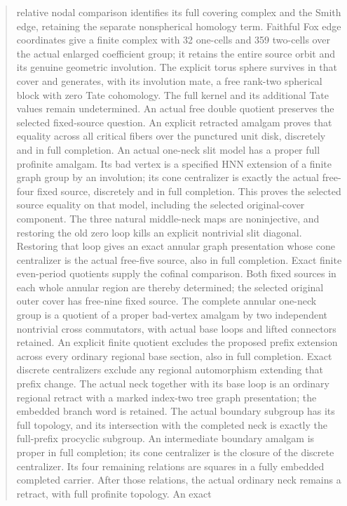 \documentclass[11pt,a4paper]{article}
\begin{document}
\begin{abstract}
relative nodal comparison identifies its full covering complex and the
Smith edge, retaining the separate nonspherical homology term. Faithful
Fox edge coordinates give a finite complex with 32 one-cells and 359
two-cells over the actual enlarged coefficient group; it retains the
entire source orbit and its genuine geometric involution. The explicit
torus sphere survives in that cover and generates, with its involution
mate, a free rank-two spherical block with zero Tate cohomology. The
full kernel and its additional Tate values remain undetermined. An actual
free double quotient preserves the selected fixed-source question.
An explicit retracted amalgam proves that equality across all critical
fibers over the punctured unit disk, discretely and in full completion.
An actual one-neck slit model has a proper full profinite amalgam.
Its bad vertex is a specified HNN extension of a finite graph group by
an involution; its cone centralizer is exactly the actual free-four
fixed source, discretely and in full completion. This proves the selected
source equality on that model, including the selected original-cover
component. The three natural middle-neck maps are noninjective, and
restoring the old zero loop kills an explicit nontrivial slit diagonal.
Restoring that loop gives an exact annular graph presentation whose
cone centralizer is the actual free-five source, also in full completion.
Exact finite even-period quotients supply the cofinal comparison. Both
fixed sources in each whole annular region are thereby determined; the
selected original outer cover has free-nine fixed source. The complete
annular one-neck group is a quotient of a proper bad-vertex amalgam by
two independent nontrivial cross commutators, with actual base loops
and lifted connectors retained. An explicit finite quotient excludes the proposed prefix extension
across every ordinary regional base section, also in full completion.
Exact discrete centralizers exclude any regional automorphism extending
that prefix change. The actual neck together with its base loop is an
ordinary regional retract with a marked index-two tree graph presentation;
the embedded branch word is retained. The actual boundary subgroup
has its full topology, and its intersection with the completed neck is
exactly the full-prefix procyclic subgroup. An intermediate boundary
amalgam is proper in full completion; its cone centralizer is the closure
of the discrete centralizer. Its four remaining relations are squares
in a fully embedded completed carrier. After those relations, the actual
ordinary neck remains a retract, with full profinite topology. An exact

\end{abstract}
\end{document}
